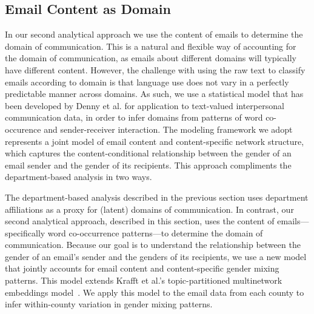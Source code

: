 \documentclass{pnastwo}
\begin{document}
\begin{article}
\section{Email Content as Domain}

In our second analytical approach we use the content of emails to determine the domain of communication. This is a natural and flexible way of accounting for the domain of communication, as emails about different domains will typically have different content. However, the challenge with using the raw text to classify emails according to domain is that language use does not vary in a perfectly predictable manner across domains. As such, we use a statistical model that has been developed by Denny et al$.$ \citep{Denny2015} for application to text-valued interpersonal communication data, in order to infer domains from patterns of word co-occurence and sender-receiver interaction. The modeling framework we adopt represents a joint model of email content and content-specific network structure, which captures the content-conditional relationship between the gender of an email sender and the gender of its recipients.  This approach compliments the department-based analysis in two ways. 

The department-based analysis described in the previous section uses
department affiliations as a proxy for (latent) domains of
communication. In contrast, our second analytical approach, described
in this section, uses the content of emails---specifically word
co-occurrence patterns---to determine the domain of
communication. Because our goal is to understand the relationship
between the gender of an email's sender and the genders of its
recipients, we use a new model that jointly accounts for email content
and content-specific gender mixing patterns. This model extends Krafft
et al.'s topic-partitioned multinetwork embeddings
model~\cite{Krafft2012}. We apply this model to the email data from
each county to infer within-county variation in gender mixing
patterns.






\end{article}
\end{document}
